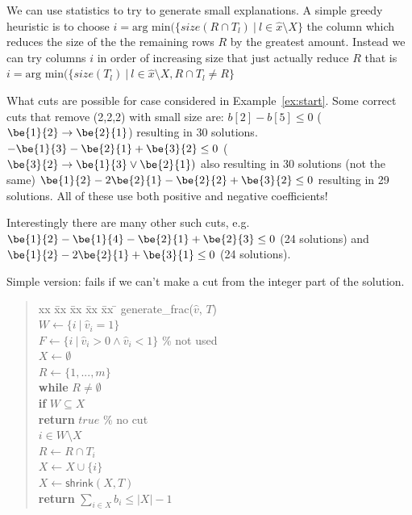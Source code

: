 We can use statistics to try to generate small explanations.
A simple greedy heuristic is to choose $i = \text{arg~min}(\{ size(R \cap T_l) ~|~ l \in \hat{x} \setminus X\}$
the column which reduces the size of the the remaining rows $R$ by the greatest amount.
Instead we can try columns $i$ in order of increasing size that just actually reduce $R$ that is
$i = \text{arg~min}(\{ size(T_l) ~|~ l \in \hat{x} \setminus X, R \cap T_l \neq R\}$ 

\begin{example}
    What cuts are possible for case considered in Example~\ref{ex:start}. Some correct cuts that remove (2,2,2) with small size are:
    $b[2] - b[5] \leq 0$ ($\be{1}{2} \rightarrow \be{2}{1}$)
    resulting in 30 solutions. 
    $-\be{1}{3} -\be{2}{1} + \be{3}{2} \leq 0$ ($\be{3}{2} \rightarrow \be{1}{3} \vee \be{2}{1})$ also resulting in 30 solutions (not the same)
    $\be{1}{2} - 2\be{2}{1} - \be{2}{2} + \be{3}{2} \leq 0$ resulting in 29 solutions. 
    All of these use both positive and negative coefficients!

    Interestingly there are many other such cuts, e.g. $\be{1}{2} - \be{1}{4} - \be{2}{1} + \be{2}{3} \leq 0$ (24 solutions) and
    $\be{1}{2}  -2\be{2}{1} + \be{3}{1} \leq 0$ (24 solutions).
\end{example}

Simple version: fails if we can't make a cut from the integer part of the solution.
\begin{quote} 
\label{lst:generate_frac}
\begin{tabbing}
    xx \= xx \= xx \= xx \= xx \= \kill
    \textsf{generate\_frac}($\hat{v}$, $T$) \\
    \> $W \gets \{ i ~|~ \hat{v}_i = 1 \}$ \\
    \> $F \gets \{ i ~|~ \hat{v}_i > 0 \wedge \hat{v}_i < 1 \}$ \% not used \\
    \> $X \gets \emptyset$ \\
    \> $R \gets \{1, ..., m\}$ \\
    \> \textbf{while} $R \neq \emptyset$ \\
    \> \> \textbf{if} $W \subseteq X$ \\
    \> \> \> \textbf{return} $true$ \% no cut \\
    \> \>  $i \in W \setminus X$ \\
    \> \> $R \gets R \cap T_i$ \\
    \> \> $X \gets X \cup \{i\}$ \\
    \> $X \gets \textsf{shrink}(X,T)$ \\
    \> \textbf{return} $\sum_{i \in X} b_i \leq |X|-1$
\end{tabbing}
\end{quote}



